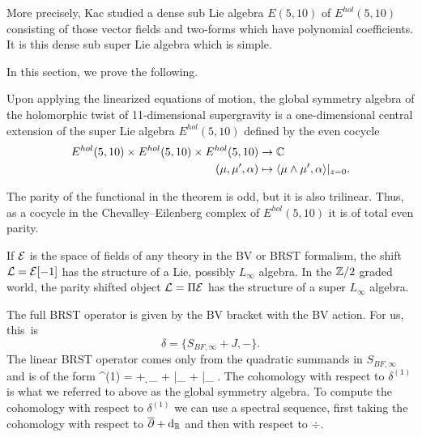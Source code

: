 \documentclass[11pt]{amsart}
\begin{document}
More precisely, Kac studied a dense sub Lie algebra $E(5,10)$ of $E^{hol}(5,10)$ consisting of those vector fields and two-forms which have polynomial coefficients.
It is this dense sub super Lie algebra which is simple.

In this section, we prove the following.

\begin{thm}\label{thm:global}
Upon applying the linearized equations of motion, the global symmetry algebra of the holomorphic twist of 11-dimensional supergravity is a one-dimensional central extension of the super Lie algebra $E^{hol}(5,10)$ defined by the even cocycle
\begin{align*}
E^{hol}(5,10) \times E^{hol}(5,10) \times E^{hol}(5,10) & \to \mathbb C \\
(\mu,\mu',\alpha) & \mapsto \langle\mu \wedge \mu', \alpha\rangle|_{z=0} .
\end{align*} 
\end{thm}

The parity of the functional in the theorem is odd, but it is also trilinear. 
Thus, as a cocycle in the Chevalley--Eilenberg complex of $E^{hol}(5,10)$ it is of total even parity.

\parsec[]

If $\mathcal E$ is the space of fields of any theory in the BV or BRST formalism, the shift $\mathcal L = \mathcal E[-1]$ has the structure of a Lie, possibly $L_\infty$ algebra. 
In the $\mathbb Z/2$ graded world, the parity shifted object $\mathcal L = \Pi \mathcal E$ has the structure of a super $L_\infty$ algebra. 

The full BRST operator is given by the BV bracket with the BV action. 
For us, this~is 
\[
\delta = \{S_{BF,\infty} + J, -\} .
\]
The linear BRST operator comes only from the quadratic summands in $S_{BF,\infty}$ and is of the form
\beqn\label{eqn:linearBRST}
\delta^{(1)} = \dbar + \d_{\RR} + \div |_{\mu \to \nu} + \del |_{\beta \to \gamma} .
\eeqn
The cohomology with respect to $\delta^{(1)}$ is what we referred to above as the global symmetry algebra.
To compute the cohomology with respect to $\delta^{(1)}$ we can use a spectral sequence, first taking the cohomology with respect to $\overline{\partial} + {\rm d}_{\mathbb R}$ and then with respect to $\div$. 
\end{document}
